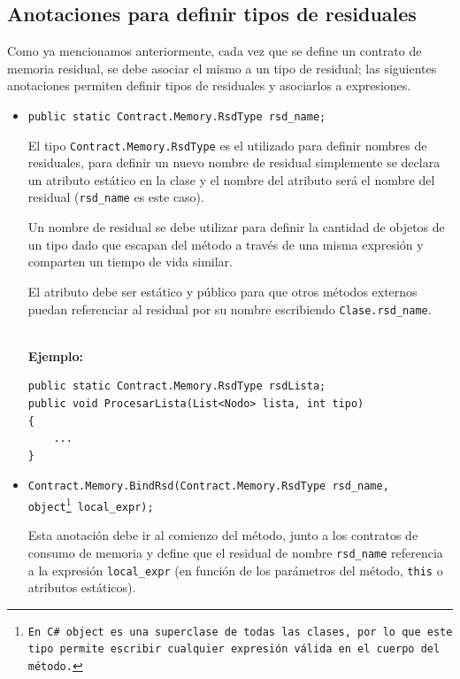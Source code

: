 \documentclass[12pt,a4paper]{article}
\newcommand\mono[1]{\texttt{#1}}
\begin{document}
		\subsection{Anotaciones para definir tipos de residuales} \label{sec:tiposres}
			Como ya mencionamos anteriormente, cada vez que se define un contrato de memoria residual, se debe asociar el mismo a un tipo de residual; las siguientes anotaciones permiten definir tipos de residuales y asociarlos a expresiones.

			\begin{itemize}
				\item
					\mono{public static Contract.Memory.RsdType rsd\_name;}

					El tipo \mono{Contract.Memory.RsdType} es el utilizado para definir nombres de residuales, para definir un nuevo nombre de residual simplemente se declara un atributo estático en la clase y el nombre del atributo será el nombre del residual (\mono{rsd\_name} es este caso).

					Un nombre de residual se debe utilizar para definir la cantidad de objetos de un tipo dado que escapan del método a través de una misma expresión y comparten un tiempo de vida similar.

					El atributo debe ser estático y público para que otros métodos externos puedan referenciar al residual por su nombre escribiendo \mono{Clase.rsd\_name}.

					\noindent\\
					\textbf{Ejemplo:}
					\begin{footnotesize}
					\begin{lstlisting}[caption=Ejemplo de \mono{Contract.Memory.RsdType},numbers=none]
public static Contract.Memory.RsdType rsdLista;
public void ProcesarLista(List<Nodo> lista, int tipo)
{
	...
}
					\end{lstlisting}
					\end{footnotesize}
				\item
					\mono{Contract.Memory.BindRsd(Contract.Memory.RsdType rsd\_name, \\ object\footnote{En C\# \mono{object} es una superclase de todas las clases, por lo que este tipo permite escribir cualquier expresión válida en el cuerpo del método.} local\_expr);}

					Esta anotación debe ir al comienzo del método, junto a los contratos de consumo de memoria y define que el residual de nombre \mono{rsd\_name} referencia a la expresión \mono{local\_expr} (en función de los parámetros del método, \mono{this} o atributos estáticos).


\end{itemize}
\end{document}
